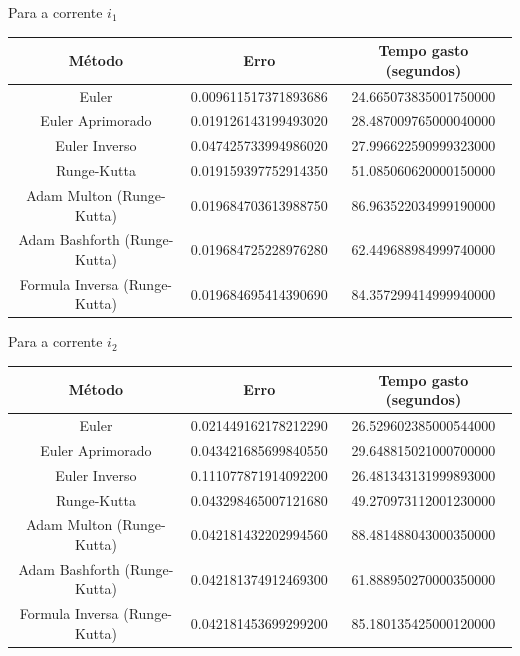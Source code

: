 \documentclass[12pt]{article}%
\newcommand{\newpara}
    {
    \vskip 0.5cm
    }
\begin{document}
    Para a corrente \(i_{1}\)
    \begin{center}
    \begin{tabular}{ |c| |c| |c| }
    \hline
    \textbf{Método}               & \textbf{Erro}        & \textbf{Tempo gasto (segundos)} \\ \hline
    Euler                         & 0.009611517371893686 & 24.665073835001750000           \\ \hline
    Euler Aprimorado              & 0.019126143199493020 & 28.487009765000040000           \\ \hline
    Euler Inverso                 & 0.047425733994986020 & 27.996622590999323000           \\ \hline
    Runge-Kutta                   & 0.019159397752914350 & 51.085060620000150000           \\ \hline
    Adam Multon     (Runge-Kutta) & 0.019684703613988750 & 86.963522034999190000           \\ \hline
    Adam Bashforth (Runge-Kutta)  & 0.019684725228976280 & 62.449688984999740000           \\ \hline
    Formula Inversa (Runge-Kutta) & 0.019684695414390690 & 84.357299414999940000           \\ \hline
    \end{tabular}
    \end{center}
    
    \newpara
    Para a corrente \(i_{2}\)
    \begin{center}
    \begin{tabular}{ |c| |c| |c| }
    \hline
    \textbf{Método}               & \textbf{Erro}        & \textbf{Tempo gasto (segundos)} \\ \hline
    Euler                         & 0.021449162178212290 & 26.529602385000544000           \\ \hline
    Euler Aprimorado              & 0.043421685699840550 & 29.648815021000700000           \\ \hline
    Euler Inverso                 & 0.111077871914092200 & 26.481343131999893000           \\ \hline
    Runge-Kutta                   & 0.043298465007121680 & 49.270973112001230000           \\ \hline
    Adam Multon     (Runge-Kutta) & 0.042181432202994560 & 88.481488043000350000           \\ \hline
    Adam Bashforth (Runge-Kutta)  & 0.042181374912469300 & 61.888950270000350000           \\ \hline
    Formula Inversa (Runge-Kutta) & 0.042181453699299200 & 85.180135425000120000           \\ \hline
    \end{tabular}
    \end{center}
    
\end{document}
